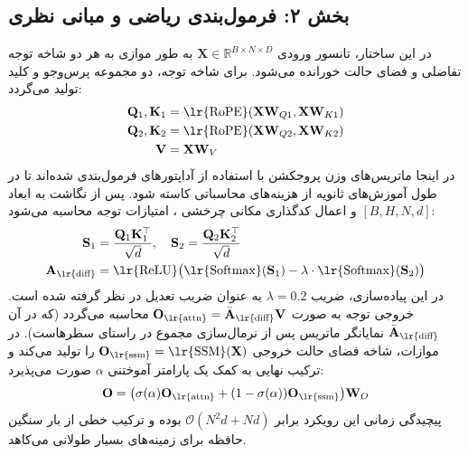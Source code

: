\subsection*{بخش ۲: فرمول‌بندی ریاضی و مبانی نظری }
در این ساختار، تانسور ورودی $\mathbf{X} \in \mathbb{R}^{B \times N \times D}$ به طور موازی به هر دو شاخه توجه تفاضلی و فضای حالت خورانده می‌شود. 
برای شاخه توجه، دو مجموعه پرس‌وجو و کلید تولید می‌گردد:
\begin{align*}
\mathbf{Q}_1, \mathbf{K}_1 &= \text{\lr{RoPE}}(\mathbf{X}\mathbf{W}_{Q1}, \mathbf{X}\mathbf{W}_{K1}) \\
\mathbf{Q}_2, \mathbf{K}_2 &= \text{\lr{RoPE}}(\mathbf{X}\mathbf{W}_{Q2}, \mathbf{X}\mathbf{W}_{K2}) \\
\mathbf{V} &= \mathbf{X}\mathbf{W}_V
\end{align*}
در اینجا ماتریس‌های وزن پروجکشن با استفاده از آداپتورهای  فرمول‌بندی شده‌اند تا در طول آموزش‌های ثانویه از هزینه‌های محاسباتی کاسته شود. پس از نگاشت به ابعاد $[B, H, N, d]$ و اعمال کدگذاری مکانی چرخشی ، امتیازات توجه محاسبه می‌شود:
\begin{align*}
\mathbf{S}_1 &= \frac{\mathbf{Q}_1\mathbf{K}_1^\top}{\sqrt{d}}, \quad \mathbf{S}_2 = \frac{\mathbf{Q}_2\mathbf{K}_2^\top}{\sqrt{d}} \\
\mathbf{A}_{\text{\lr{diff}}} &= \text{\lr{ReLU}}\big(\text{\lr{Softmax}}(\mathbf{S}_1) - \lambda \cdot \text{\lr{Softmax}}(\mathbf{S}_2)\big)
\end{align*}
در این پیاده‌سازی، ضریب $\lambda = 0.2$ به عنوان ضریب تعدیل در نظر گرفته شده است. خروجی توجه به صورت $\mathbf{O}_{\text{\lr{attn}}} = \bar{\mathbf{A}}_{\text{\lr{diff}}} \mathbf{V}$ محاسبه می‌گردد (که در آن $\bar{\mathbf{A}}_{\text{\lr{diff}}}$ نمایانگر ماتریس پس از نرمال‌سازی مجموع در راستای سطرهاست).
در موازات، شاخه فضای حالت خروجی $\mathbf{O}_{\text{\lr{ssm}}} = \text{\lr{SSM}}(\mathbf{X})$ را تولید می‌کند و ترکیب نهایی به کمک یک پارامتر آموختنی $\alpha$ صورت می‌پذیرد:
\begin{equation}
\mathbf{O} = \big(\sigma(\alpha) \mathbf{O}_{\text{\lr{attn}}} + (1 - \sigma(\alpha)) \mathbf{O}_{\text{\lr{ssm}}}\big) \mathbf{W}_O
\end{equation}
پیچیدگی زمانی این رویکرد برابر $\mathcal{O}(N^2 d + N d)$ بوده و ترکیب خطی  از بار سنگین حافظه برای زمینه‌های بسیار طولانی می‌کاهد.

